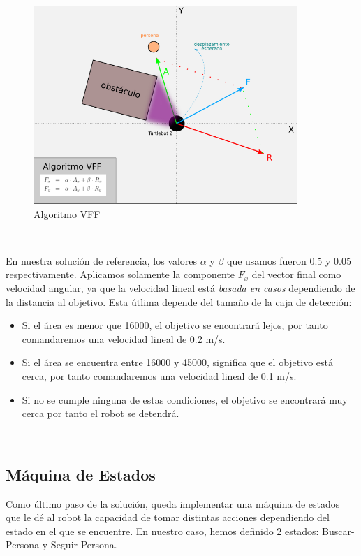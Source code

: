 \begin{figure} [H]
  \begin{center}
    \includegraphics[width=10cm]{imagenes/cap6/esquema-vff.png}
  \end{center}
  \caption[Algoritmo VFF]{Algoritmo VFF}
  \label{fig:esquema_vff}
\end{figure}\

En nuestra solución de referencia, los valores $\alpha$ y $\beta$ que usamos fueron 0.5 y 0.05 respectivamente. Aplicamos solamente la componente $F_x$ del vector final como velocidad angular, ya que la velocidad lineal está \textit{basada en casos} dependiendo de la distancia al objetivo. Esta útlima depende del tamaño de la caja de detección:

\begin{itemize}
	\item Si el área es menor que 16000, el objetivo se encontrará lejos, por tanto comandaremos una velocidad lineal de 0.2 m/s.
	\item Si el área se encuentra entre 16000 y 45000, significa que el objetivo está cerca, por tanto comandaremos una velocidad lineal de 0.1 m/s.
	\item Si no se cumple ninguna de estas condiciones, el objetivo se encontrará muy cerca por tanto el robot se detendrá.
\end{itemize}\


\subsection{Máquina de Estados}
\label{subsec:maquina_estados}

Como último paso de la solución, queda implementar una máquina de estados que le dé al robot la capacidad de tomar distintas acciones dependiendo del estado en el que se encuentre. En nuestro caso, hemos definido 2 estados: Buscar-Persona y Seguir-Persona.\\

